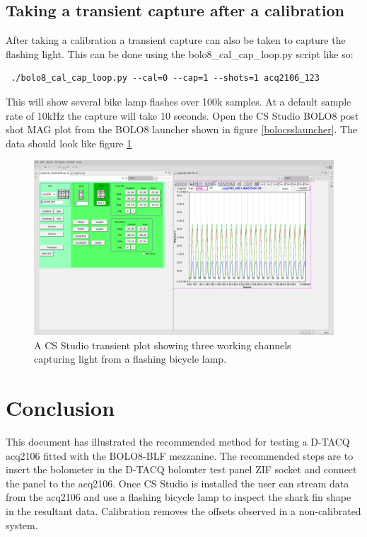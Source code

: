 \documentclass{article}
\begin{document}
\subsection{Taking a transient capture after a calibration}
After taking a calibration a transient capture can also be taken to capture the flashing light.
This can be done using the bolo8\_cal\_cap\_loop.py script like so:

\begin{verbatim} ./bolo8_cal_cap_loop.py --cal=0 --cap=1 --shots=1 acq2106_123\end{verbatim}

This will show several bike lamp flashes over 100k samples.
At a default sample rate of 10kHz the capture will take 10 seconds.
Open the CS Studio BOLO8 post shot MAG plot from the BOLO8 launcher shown in figure \ref{bolocsslauncher}.
The data should look like figure \ref{cssbolotransient}

\begin{figure} [hbt!]
	\centering
	\includegraphics[width=5.0in]{images/bolo-css-transient.png}
	\caption{A CS Studio transient plot showing three working channels capturing light from a flashing bicycle lamp.}
	\label{cssbolotransient}
\end{figure}

\section{Conclusion}
This document has illustrated the recommended method for testing a \mbox{D-TACQ} acq2106 fitted with the BOLO8-BLF mezzanine.
The recommended steps are to insert the bolometer in the \mbox{D-TACQ} bolomter test panel ZIF socket and connect the panel to the acq2106.
Once CS Studio is installed the user can stream data from the acq2106 and use a flashing bicycle lamp to inspect the shark fin shape in the resultant data. Calibration removes the offsets observed in a non-calibrated system. 
\end{document}
